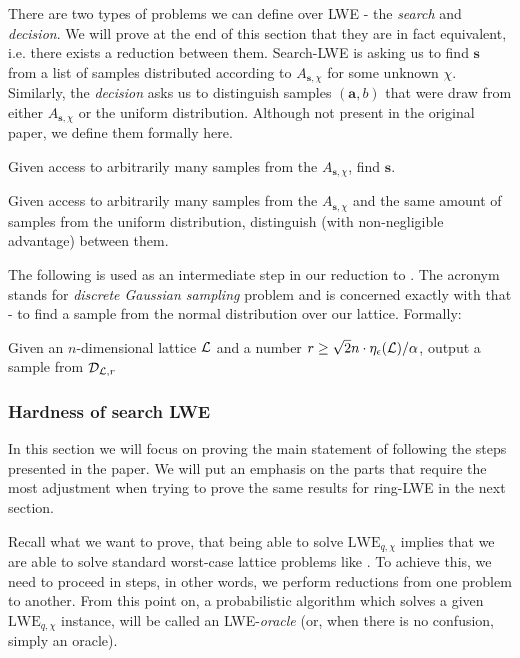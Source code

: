 There are two types of problems we can define over LWE - the \textit{search} and \textit{decision}. We will prove at the end of this section that they are in fact equivalent, i.e. there exists a reduction between them. Search-LWE is asking us to find $\bm{s}$ from a list of samples distributed according to $A_{\bm{s}, \chi}$ for some unknown $\chi$. Similarly, the \textit{decision} asks us to distinguish samples $(\bm{a}, b)$ that were draw from either $A_{\bm{s}, \chi}$ or the uniform distribution. Although not present in the original paper, we define them formally here.
\begin{definition}\label{slwe}
	Given access to arbitrarily many samples from the $A_{\bm{s}, \chi}$, find $\bm{s}$.
\end{definition}
\begin{definition}\label{dlwe}
	Given access to arbitrarily many samples from the $A_{\bm{s}, \chi}$ and the same amount of samples from the uniform distribution, distinguish (with non-negligible advantage) between them.
\end{definition}
The following is used as an intermediate step in our reduction to . The acronym  stands for \textit{discrete Gaussian sampling} problem and is concerned exactly with that - to find a sample from the normal distribution over our lattice. Formally:
\begin{definition}\label{dgs}
	Given an $n$-dimensional lattice $\mathcal{L}$ and a number $r \geq \sqrt{2}n \cdot \eta_{\epsilon}(\mathcal{L})/\alpha$, output a sample from $\mathcal{D}_{\mathcal{L},r}$
\end{definition}

\subsubsection{Hardness of search LWE}
In this section we will focus on proving the main statement of \cite{regev} following the steps presented in the paper. We will put an emphasis on the parts that require the most adjustment when trying to prove the same results for ring-LWE in the next section.

Recall what we want to prove, that being able to solve $\text{LWE}_{q, \chi}$ implies that we are able to solve standard worst-case lattice problems like . To achieve this, we need to proceed in steps, in other words, we perform reductions from one problem to another. From this point on, a probabilistic algorithm which solves a given $\text{LWE}_{q, \chi}$ instance, will be called an LWE-\textit{oracle} (or, when there is no confusion, simply an oracle).

